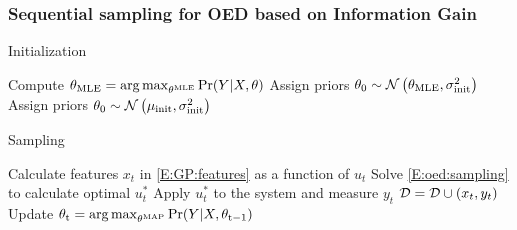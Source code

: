 \begin{frame}[t]
	
	\frametitle{Sequential sampling for OED based on Information Gain}
	
	\begin{block}{Initialization}
			\begin{algorithmic}
				\State Compute \( \theta_{\mathrm{MLE}} = \operatorname*{arg\,max}_{\theta^{\mathrm{MLE}}} \Pr(Y \vert X, \theta)\)
				\State Assign priors \(\theta_{\mathrm{0}} \sim \operatorname*{\mathcal{N}}\left(\theta_{\mathrm{MLE}}, \sigma^2_{\mathrm{init}}\right)\)
				\Else 
				\State Assign priors \(\theta_{\mathrm{0}} \sim \operatorname*{\mathcal{N}}\left(\mu_{\mathrm{{init}}}, \sigma^2_\mathrm{init}\right)\)
				\EndIf
			\end{algorithmic}
	\end{block}

	\begin{block}{Sampling}
		\setlength\textwidth{0.9\textwidth}
		\begin{algorithmic}
			\While{\(t<t_{\mathrm{max}}\)}
			\State Calculate features \(x_t\) in \eqref{E:GP:features} as a function of \(u_t\)
			\State Solve \eqref{E:oed:sampling} to calculate optimal \(u^*_t\)
			\State Apply \(u^*_t\) to the system and measure \(y_t\)
			\State \(\mathcal{D} = \mathcal{D} \cup (x_t,y_t) \)
			\State Update \( \theta_{\mathrm{t}} = \operatorname*{arg\,max}_{\theta^{\mathrm{MAP}}} \Pr(Y \vert X, \theta_{\mathrm{t-1}})\)
			\EndWhile
		\end{algorithmic}
	\end{block}

\end{frame}

